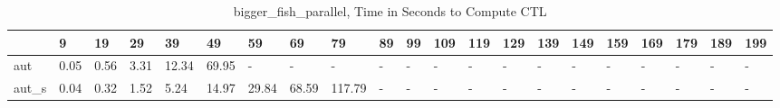 \begin{table}
\caption{bigger_fish_parallel, Time in Seconds to Compute CTL}
\label{bigger_fish_parallel_CTL_time}
\begin{tabular}{lllllllllllllllllllll}
\toprule
 & 9 & 19 & 29 & 39 & 49 & 59 & 69 & 79 & 89 & 99 & 109 & 119 & 129 & 139 & 149 & 159 & 169 & 179 & 189 & 199 \\
\midrule
aut & 0.05 & 0.56 & 3.31 & 12.34 & 69.95 & - & - & - & - & - & - & - & - & - & - & - & - & - & - & - \\
aut_s & 0.04 & 0.32 & 1.52 & 5.24 & 14.97 & 29.84 & 68.59 & 117.79 & - & - & - & - & - & - & - & - & - & - & - & - \\
\bottomrule
\end{tabular}
\end{table}
